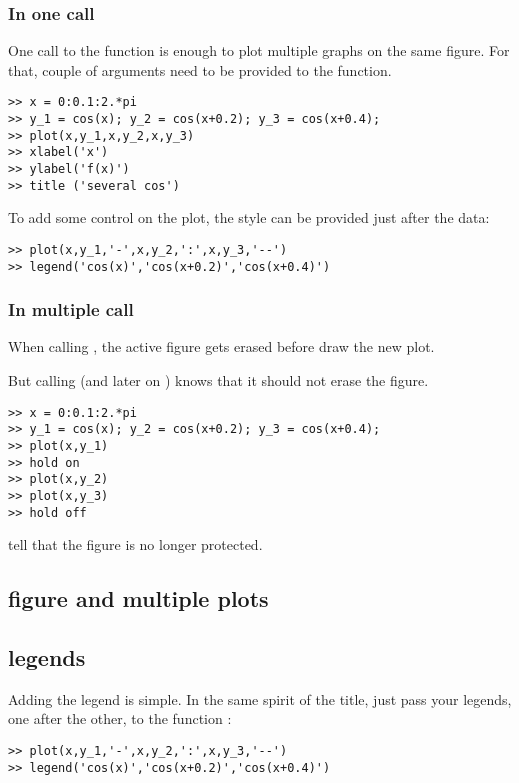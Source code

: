 		\subsubsection{In one call}
			One call to the function  is enough to plot multiple graphs on the same figure.
			For that, couple of arguments need to be provided to the  function.
\begin{lstlisting}
>> x = 0:0.1:2.*pi
>> y_1 = cos(x); y_2 = cos(x+0.2); y_3 = cos(x+0.4);
>> plot(x,y_1,x,y_2,x,y_3)
>> xlabel('x')
>> ylabel('f(x)')
>> title ('several cos')
\end{lstlisting}
			To add some control on the plot, the style can be provided just after the data:
\begin{lstlisting}
>> plot(x,y_1,'-',x,y_2,':',x,y_3,'--')
>> legend('cos(x)','cos(x+0.2)','cos(x+0.4)')
\end{lstlisting}

		\subsubsection{In multiple call}
			When calling , the active figure gets erased before \matlab draw the new plot.
			
			But calling  (and later on ) \matlab knows that it should not erase the figure.
\begin{lstlisting}
>> x = 0:0.1:2.*pi
>> y_1 = cos(x); y_2 = cos(x+0.2); y_3 = cos(x+0.4);
>> plot(x,y_1)
>> hold on
>> plot(x,y_2)
>> plot(x,y_3)
>> hold off
\end{lstlisting}
			 tell \matlab that the figure is no longer protected.

	\subsection{figure and multiple plots}


	\subsection{legends}
		Adding the legend is simple.
		In the same spirit of the title, just pass your legends, one after the other, to the function :
\begin{lstlisting}
>> plot(x,y_1,'-',x,y_2,':',x,y_3,'--')
>> legend('cos(x)','cos(x+0.2)','cos(x+0.4)')
\end{lstlisting}








